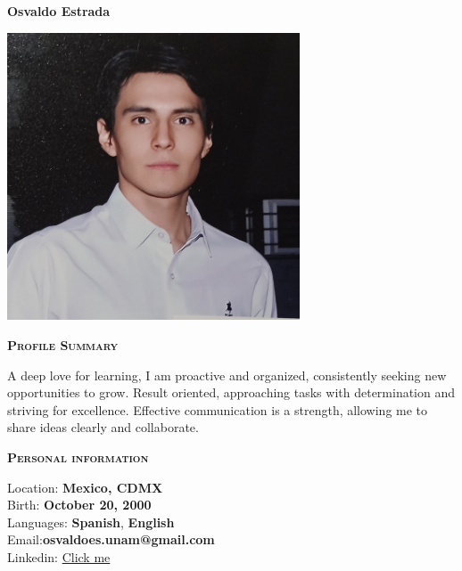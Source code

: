\documentclass[11pt, a4paper]{article}
\newcommand{\headleft}[1]{\vspace*{3ex}\textsc{\textbf{#1}}\par%
    \vspace*{-1.5ex}\hrulefill\par\vspace*{0.7ex}}
\begin{document}
\setlength{\topskip}{0pt}
\setlength{\parindent}{0pt}
\setlength{\parskip}{0pt}
\setlength{\fboxsep}{0pt}
\pagestyle{empty}
\raggedbottom

\begin{minipage}[t]{0.33\textwidth} %
\colorbox{cvblue}{\begin{minipage}[t][5mm][t]{\textwidth}\null\hfill\null\end{minipage}}

\vspace{-.2ex} %
\colorbox{cvblue!90}{\color{white}  %
\textwidth\relax%
\begin{minipage}[t][293mm][t]{0.82\textwidth}
\raggedright
\vspace*{2.5ex}

\Large \textbf{Osvaldo Estrada} \normalsize 

\null\hfill\includegraphics[width=0.65\textwidth]{osvaldo.jpg}\hfill\null

\vspace*{0.5ex} %

\headleft{Profile Summary}
A deep love for learning, I am
proactive and organized, consistently
seeking new opportunities to grow.
Result oriented, approaching tasks
with determination and striving for
excellence. Effective communication
is a strength, allowing me to share
ideas clearly and collaborate.


\headleft{Personal information}
Location: \textbf{Mexico, CDMX} \\[0.5ex]
Birth: \textbf{October 20, 2000} \\[0.5ex]
Languages: \textbf{Spanish}, \textbf{English} \\[0.5ex]
Email:\textbf{osvaldoes.unam@gmail.com} \\[0.5ex]
Linkedin: \href{https://www.linkedin.com/in/osvaldo-israel-estrada-sosa-19529919a/}{Click me}


\end{minipage}}
\end{minipage}
\end{document}
